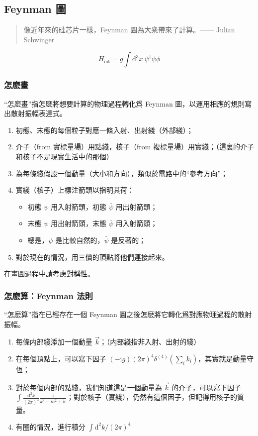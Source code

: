 \documentclass{article}
\begin{document}
\subsection{Feynman 圖}

\begin{quote}
  像近年來的硅芯片一樣，Feynman 圖為大衆帶來了計算。—— Julian Schwinger
\end{quote}

$$H_{\mathrm{int}}=g\int\mathrm{d}^3x\ \psi^{\dagger}\psi\phi$$

\subsubsection{怎麽畫}

“怎麽畫”指怎麽將想要計算的物理過程轉化爲 Feynman 圖，以運用相應的規則寫出散射振幅表達式。

\begin{enumerate}
  \item 初態、末態的每個粒子對應一條入射、出射綫（外部綫）；
  \item 介子（from 實標量場）用點綫，核子（from 複標量場）用實綫；（這裏的介子和核子不是現實生活中的那個）
  \item 為每條綫假設一個動量（大小和方向），類似於電路中的“參考方向”；
  \item 實綫（核子）上標注箭頭以指明其荷：\begin{itemize}
          \item 初態 $\psi$ 用入射箭頭，初態 $\bar\psi$ 用出射箭頭；
          \item 末態 $\psi$ 用出射箭頭，末態 $\bar\psi$ 用入射箭頭；
          \item 總是，$\psi$ 是比較自然的，$\bar\psi$ 是反著的；
        \end{itemize}
  \item 對於現在的情況，用三價的頂點將他們連接起來。
\end{enumerate}

在畫圖過程中請考慮對稱性。

\subsubsection{怎麽算：Feynman 法則}

“怎麽算”指在已經存在一個 Feynman 圖之後怎麽將它轉化爲對應物理過程的散射振幅。

\begin{enumerate}
  \item 每條内部綫添加一個動量 $\vec{k}$；（内部綫指非入射、出射的綫）
  \item 在每個頂點上，可以寫下因子 $(-\mathrm{i}g)(2\pi)^4\delta^{(4)}\left(\sum_ik_i\right)$，其實就是動量守恆；
  \item 對於每個内部的點綫，我們知道這是一個動量為 $\vec{k}$ 的介子，可以寫下因子 $\int\frac{\mathrm{d}^2k}{(2\pi)^4}\frac{\mathrm{i}}{k^2-m^2+\mathrm{i}\epsilon}$；對於核子（實綫），仍然有這個因子，但記得用核子的質量。
  \item 有圈的情況，進行積分 $\int\mathrm{d}^2k/(2\pi)^4$
\end{enumerate}
\end{document}
